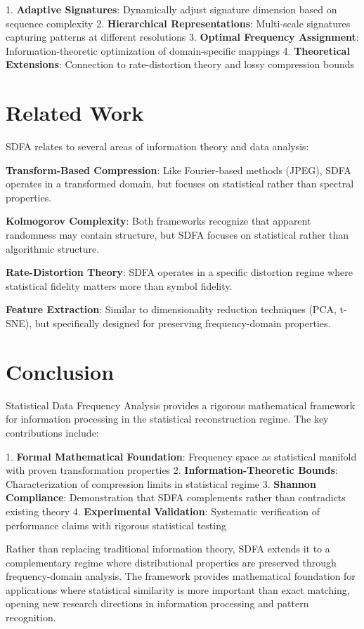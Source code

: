 \documentclass[10pt,journal,compsoc]{IEEEtran}
\newcommand{\sdfa}{\textsc{SDFA}}
\begin{document}
1. \textbf{Adaptive Signatures}: Dynamically adjust signature dimension based on sequence complexity
2. \textbf{Hierarchical Representations}: Multi-scale signatures capturing patterns at different resolutions
3. \textbf{Optimal Frequency Assignment}: Information-theoretic optimization of domain-specific mappings
4. \textbf{Theoretical Extensions}: Connection to rate-distortion theory and lossy compression bounds

\section{Related Work}

\sdfa{} relates to several areas of information theory and data analysis:

\textbf{Transform-Based Compression}: Like Fourier-based methods (JPEG), \sdfa{} operates in a transformed domain, but focuses on statistical rather than spectral properties.

\textbf{Kolmogorov Complexity}: Both frameworks recognize that apparent randomness may contain structure, but \sdfa{} focuses on statistical rather than algorithmic structure.

\textbf{Rate-Distortion Theory}: \sdfa{} operates in a specific distortion regime where statistical fidelity matters more than symbol fidelity.

\textbf{Feature Extraction}: Similar to dimensionality reduction techniques (PCA, t-SNE), but specifically designed for preserving frequency-domain properties.

\section{Conclusion}

Statistical Data Frequency Analysis provides a rigorous mathematical framework for information processing in the statistical reconstruction regime. The key contributions include:

1. \textbf{Formal Mathematical Foundation}: Frequency space as statistical manifold with proven transformation properties
2. \textbf{Information-Theoretic Bounds}: Characterization of compression limits in statistical regime
3. \textbf{Shannon Compliance}: Demonstration that \sdfa{} complements rather than contradicts existing theory
4. \textbf{Experimental Validation}: Systematic verification of performance claims with rigorous statistical testing

Rather than replacing traditional information theory, \sdfa{} extends it to a complementary regime where distributional properties are preserved through frequency-domain analysis. The framework provides mathematical foundation for applications where statistical similarity is more important than exact matching, opening new research directions in information processing and pattern recognition.
\end{document}
